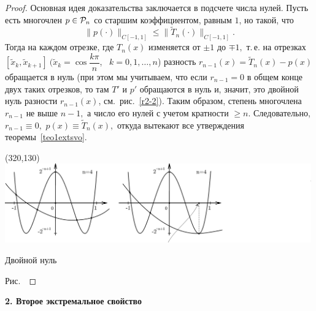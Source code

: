 \begin{proof}
Основная идея доказательства заключается в подсчете числа нулей. Пусть есть многочлен
$p \in \mathcal{P}_n$ %
{со старшим коэффициентом, равным $1$,}
но {такой, что}
$$
  \|p(\cdot )\|_{C[-1,1]}  \le \|\widetilde T_n(\cdot )\|_{C[-1,1]}.
$$
Тогда на каждом отрезке, где {$T_n(x)$} изменяется от {$\pm 1$} до {$\mp 1,$ т.\,е. на }
{отрезках $[\widetilde x_k, \widetilde
x_{k+1}]\ (\widetilde x_k=\cos \dfrac{k\pi}{n}$, \
$k={0,1,}\ldots,n$)} разность {$r_{n-1}(x)=\widetilde T_n(x)-p(x)$} обращается в нуль
{(при этом мы учитываем, что если $r_{n-1}=0$ в общем конце двух} {таких отрезков,
то там $T'$ и $p'$ обращаются в нуль и, значит, это
двойной нуль} {разности $r_{n-1}(x)$, см.~рис.~\ref{r2-2}).} {Таким образом,}
степень многочлена $r_{n-1}$ не выше $n-1,$ {а число его
нулей с учетом кратности $\ge n.$} {Следовательно,} $r_{n-1} \equiv 0,$ {$p(x)
\equiv \widetilde T_n(x),$ откуда вытекают все утверждения
теоремы~\ref{teo1extsvo}.} %

\begin{center}
\begin{picture}(320,130)
\includegraphics[width=0.99\textwidth]{pict/pict02-2.eps}
\end{picture}

\label{r2-2}
\end{center}

 \hspace{9.5cm} {Двойной нуль}


 \centerline{\normalsize Рис.~\theris}
\end{proof}

\vspace{2mm}
{\bf 2. Второе экстремальное свойство}
\vspace{3mm}

